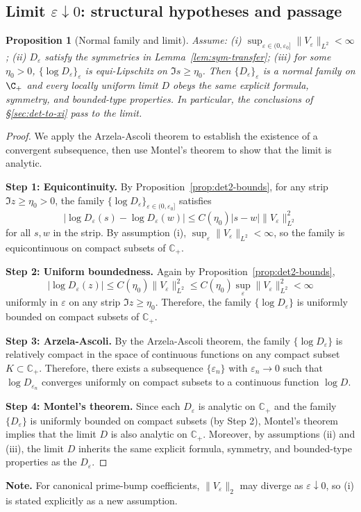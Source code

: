 ﻿\documentclass[12pt,a4paper]{article}
\newtheorem{proposition}[theorem]{Proposition}
\theoremstyle{definition}
\theoremstyle{remark}
\newcommand{\CC}{\mathbb{C}}
\begin{document}
\subsection{Limit $\varepsilon\downarrow0$: structural hypotheses and passage}\label{subsec:eps-limit}
\begin{proposition}[Normal family and limit]\label{prop:limit}
Assume: (i) $\sup_{\varepsilon\in(0,\varepsilon_0]}\|V_\varepsilon\|_{L^2}<\infty$; (ii) $D_\varepsilon$ satisfy the symmetries in Lemma~\ref{lem:sym-transfer};
(iii) for some $\eta_0>0$, $\{\log D_\varepsilon\}_{\varepsilon}$ is equi-Lipschitz on $\Im s\ge\eta_0$. Then $\{D_\varepsilon\}_\varepsilon$ is a normal family on $\C_+$ and
every locally uniform limit $D$ obeys the same explicit formula, symmetry, and bounded-type properties. In particular, the conclusions of \S\ref{sec:det-to-xi} pass to the limit.
\end{proposition}
\begin{proof}
We apply the Arzela-Ascoli theorem to establish the existence of a convergent subsequence, then use Montel's theorem to show that the limit is analytic.

\textbf{Step 1: Equicontinuity.}
By Proposition~\ref{prop:det2-bounds}, for any strip $\Im z \geq \eta_0 > 0$, the family $\{\log D_\varepsilon\}_{\varepsilon \in (0,\varepsilon_0]}$ satisfies
\[
  |\log D_\varepsilon(s) - \log D_\varepsilon(w)| \leq C(\eta_0)|s-w|\|V_\varepsilon\|_{L^2}^2
\]
for all $s, w$ in the strip. By assumption (i), $\sup_\varepsilon \|V_\varepsilon\|_{L^2} < \infty$, so the family is equicontinuous on compact subsets of $\CC_+$.

\textbf{Step 2: Uniform boundedness.}
Again by Proposition~\ref{prop:det2-bounds},
\[
  |\log D_\varepsilon(z)| \leq C(\eta_0)\|V_\varepsilon\|_{L^2}^2 \leq C(\eta_0)\sup_\varepsilon\|V_\varepsilon\|_{L^2}^2 < \infty
\]
uniformly in $\varepsilon$ on any strip $\Im z \geq \eta_0$. Therefore, the family $\{\log D_\varepsilon\}$ is uniformly bounded on compact subsets of $\CC_+$.

\textbf{Step 3: Arzela-Ascoli.}
By the Arzela-Ascoli theorem, the family $\{\log D_\varepsilon\}$ is relatively compact in the space of continuous functions on any compact subset $K \subset \CC_+$. Therefore, there exists a subsequence $\{\varepsilon_n\}$ with $\varepsilon_n \to 0$ such that $\log D_{\varepsilon_n}$ converges uniformly on compact subsets to a continuous function $\log D$.

\textbf{Step 4: Montel's theorem.}
Since each $D_\varepsilon$ is analytic on $\CC_+$ and the family $\{D_\varepsilon\}$ is uniformly bounded on compact subsets (by Step 2), Montel's theorem implies that the limit $D$ is also analytic on $\CC_+$. Moreover, by assumptions (ii) and (iii), the limit $D$ inherits the same explicit formula, symmetry, and bounded-type properties as the $D_\varepsilon$.
\end{proof}
\noindent
\textbf{Note.} For canonical prime-bump coefficients, $\|V_\varepsilon\|_2$ may diverge as $\varepsilon\downarrow0$, so (i) is stated explicitly as a new assumption.
\end{document}
